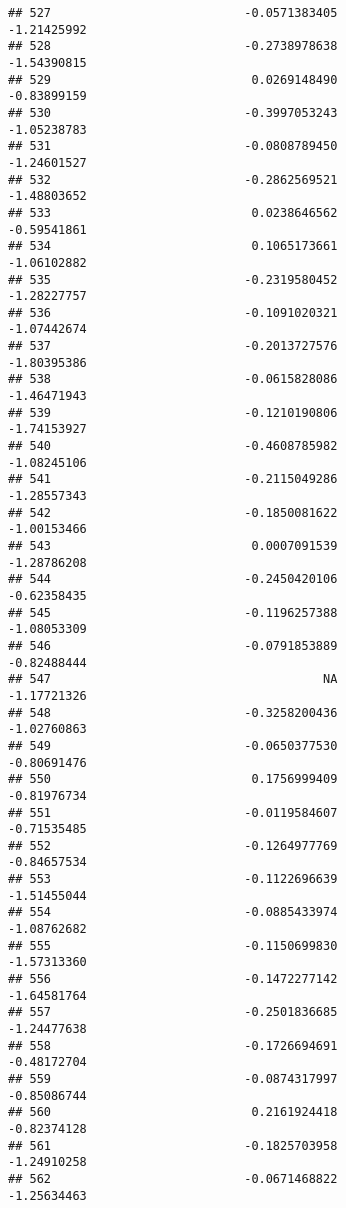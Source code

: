 \documentclass[
]{article}
\begin{document}
\begin{verbatim}
## 527                           -0.0571383405                -1.21425992
## 528                           -0.2738978638                -1.54390815
## 529                            0.0269148490                -0.83899159
## 530                           -0.3997053243                -1.05238783
## 531                           -0.0808789450                -1.24601527
## 532                           -0.2862569521                -1.48803652
## 533                            0.0238646562                -0.59541861
## 534                            0.1065173661                -1.06102882
## 535                           -0.2319580452                -1.28227757
## 536                           -0.1091020321                -1.07442674
## 537                           -0.2013727576                -1.80395386
## 538                           -0.0615828086                -1.46471943
## 539                           -0.1210190806                -1.74153927
## 540                           -0.4608785982                -1.08245106
## 541                           -0.2115049286                -1.28557343
## 542                           -0.1850081622                -1.00153466
## 543                            0.0007091539                -1.28786208
## 544                           -0.2450420106                -0.62358435
## 545                           -0.1196257388                -1.08053309
## 546                           -0.0791853889                -0.82488444
## 547                                      NA                -1.17721326
## 548                           -0.3258200436                -1.02760863
## 549                           -0.0650377530                -0.80691476
## 550                            0.1756999409                -0.81976734
## 551                           -0.0119584607                -0.71535485
## 552                           -0.1264977769                -0.84657534
## 553                           -0.1122696639                -1.51455044
## 554                           -0.0885433974                -1.08762682
## 555                           -0.1150699830                -1.57313360
## 556                           -0.1472277142                -1.64581764
## 557                           -0.2501836685                -1.24477638
## 558                           -0.1726694691                -0.48172704
## 559                           -0.0874317997                -0.85086744
## 560                            0.2161924418                -0.82374128
## 561                           -0.1825703958                -1.24910258
## 562                           -0.0671468822                -1.25634463

\end{verbatim}
\end{document}
